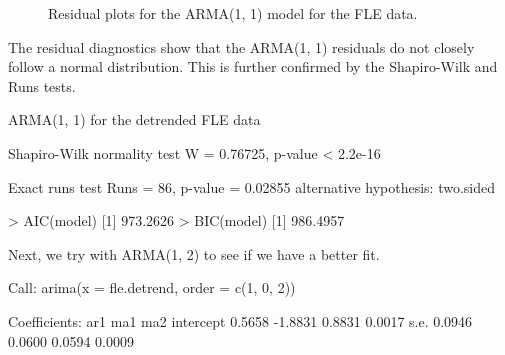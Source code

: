 \begin{enumerate}[label=(\alph*)]
\begin{figure}[!htb]
    \caption[Residual plots for the ARMA(1, 1) model for the FLE data.]{Residual plots for the ARMA(1, 1) model for the FLE data.}
    \label{fig:res_fle_arma_11}
\end{figure}
The residual diagnostics show that the ARMA(1, 1) residuals do not closely follow a normal distribution. This is further confirmed by the Shapiro-Wilk and Runs tests.
\small\begin{block}
ARMA(1, 1) for the detrended FLE data

Shapiro-Wilk normality test
W = 0.76725, p-value < 2.2e-16

Exact runs test
Runs = 86, p-value = 0.02855
alternative hypothesis: two.sided

> AIC(model)
[1] 973.2626
> BIC(model)
[1] 986.4957
\end{block}
\normalsize Next, we try with ARMA(1, 2) to see if we have a better fit.
\small\begin{block}
Call:
arima(x = fle.detrend, order = c(1, 0, 2))

Coefficients:
         ar1      ma1     ma2  intercept
      0.5658  -1.8831  0.8831     0.0017
s.e.  0.0946   0.0600  0.0594     0.0009


\end{block}
\end{enumerate}
